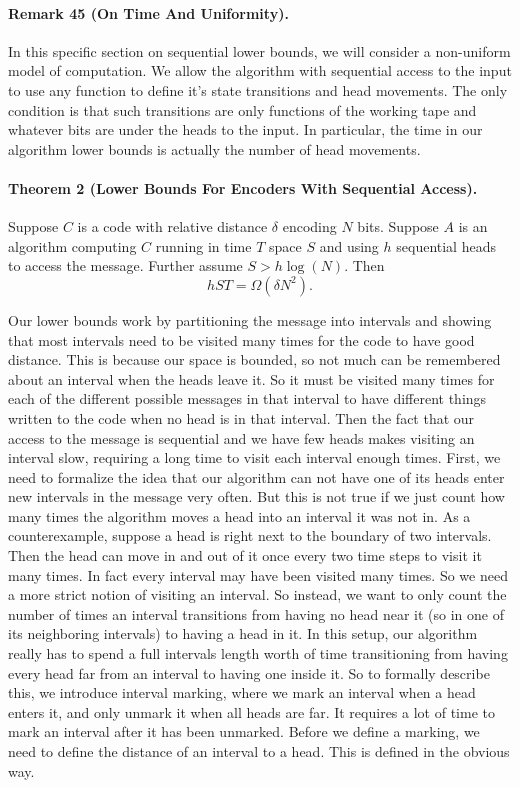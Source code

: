 \documentclass[10pt,a4paper]{article}
\begin{document}
\paragraph{Remark 45 (On Time And Uniformity).} In this specific section on sequential lower bounds, we will consider a non-uniform model of computation. We allow the algorithm with sequential access to the input to use any function to define it's state transitions and head movements. The only condition is that such transitions are only functions of the working tape and whatever bits are under the heads to the input.
In particular, the time in our algorithm lower bounds is actually the number of head movements.

\paragraph{Theorem 2 (Lower Bounds For Encoders With Sequential Access).} Suppose $C$ is a code with relative distance $\delta$ encoding $N$ bits. Suppose $A$ is an algorithm computing $C$ running in time $T$ space $S$ and using $h$ sequential heads to access the message. Further assume $S>h\log(N)$. Then
\[hST=\Omega(\delta N^2).\]

Our lower bounds work by partitioning the message into intervals and showing that most intervals need to be visited many times for the code to have good distance. This is because our space is bounded, so not much can be remembered about an interval when the heads leave it. So it must be visited many times for each of the different possible messages in that interval to have different things written to the code when no head is in that interval. Then the fact that our access to the message is sequential and we have few heads makes visiting an interval slow, requiring a long time to visit each interval enough times.
First, we need to formalize the idea that our algorithm can not have one of its heads enter new intervals in the message very often. But this is not true if we just count how many times the algorithm moves a head into an interval it was not in. As a counterexample, suppose a head is right next to the boundary of two intervals. Then the head can move in and out of it once every two time steps to visit it many times. In fact every interval may have been visited many times. So we need a more strict notion of visiting an interval.
So instead, we want to only count the number of times an interval transitions from having no head near it (so in one of its neighboring intervals) to having a head in it. In this setup, our algorithm really has to spend a full intervals length worth of time transitioning from having every head far from an interval to having one inside it. So to formally describe this, we introduce interval marking, where we mark an interval when a head enters it, and only unmark it when all heads are far. It requires a lot of time to mark an interval after it has been unmarked.
Before we define a marking, we need to define the distance of an interval to a head. This is defined in the obvious way.
\end{document}
